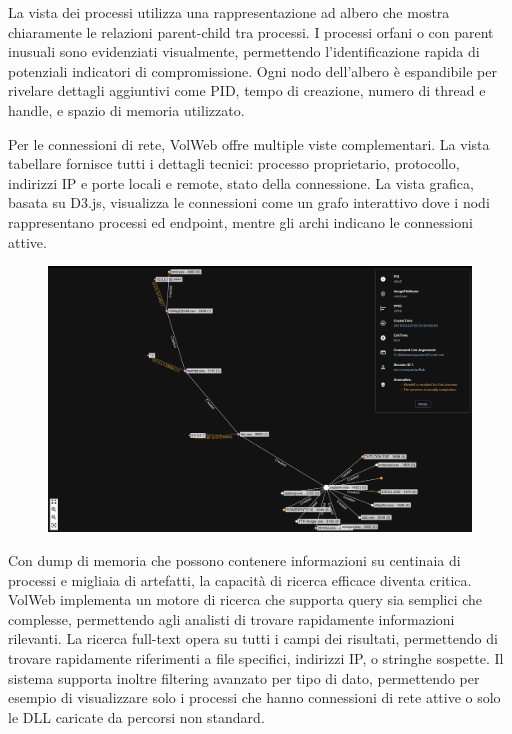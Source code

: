 La vista dei processi utilizza una rappresentazione ad albero che mostra chiaramente le relazioni parent-child tra processi. I processi orfani o con parent inusuali sono evidenziati visualmente, permettendo l'identificazione rapida di potenziali indicatori di compromissione. Ogni nodo dell'albero è espandibile per rivelare dettagli aggiuntivi come PID, tempo di creazione, numero di thread e handle, e spazio di memoria utilizzato.

Per le connessioni di rete, VolWeb offre multiple viste complementari. La vista tabellare fornisce tutti i dettagli tecnici: processo proprietario, protocollo, indirizzi IP e porte locali e remote, stato della connessione. La vista grafica, basata su D3.js, visualizza le connessioni come un grafo interattivo dove i nodi rappresentano processi ed endpoint, mentre gli archi indicano le connessioni attive.

\begin{figure}[H]
    \centering
    \includegraphics[width=0.9\linewidth]{images/volweb-original/volweb-network-graph.png}
\end{figure}

Con dump di memoria che possono contenere informazioni su centinaia di processi e migliaia di artefatti, la capacità di ricerca efficace diventa critica. VolWeb implementa un motore di ricerca che supporta query sia semplici che complesse, permettendo agli analisti di trovare rapidamente informazioni rilevanti. La ricerca full-text opera su tutti i campi dei risultati, permettendo di trovare rapidamente riferimenti a file specifici, indirizzi IP, o stringhe sospette. Il sistema supporta inoltre filtering avanzato per tipo di dato, permettendo per esempio di visualizzare solo i processi che hanno connessioni di rete attive o solo le DLL caricate da percorsi non standard.


